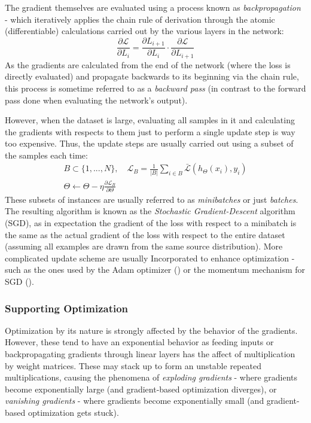 \documentclass{article}
\begin{document}
\medskip
\noindent
The gradient themselves are evaluated using a process known as \emph{backpropagation} - which iteratively applies the chain rule of derivation through the atomic (differentiable) calculations carried out by the various layers in the network:
\begin{equation*}
    \frac{\partial \mathcal{L}}{\partial L_i} = \frac{\partial L_{i+1}}{\partial L_i} \cdot \frac{\partial \mathcal{L}}{\partial L_{i+1}}
\end{equation*}
As the gradients are calculated from the end of the network (where the loss is directly evaluated) and propagate backwards to its beginning via the chain rule, this process is sometime referred to as a \emph{backward pass} (in contrast to the forward pass done when evaluating the network's output).

\medskip
\noindent
However, when the dataset is large, evaluating all samples in it and calculating the gradients with respects to them just to perform a single update step is way too expensive. Thus, the update steps are usually carried out using a subset of the samples each time:
\begin{equation*}
    \begin{gathered}
        B \subset \{1,...,N\}, \quad \mathcal{L}_B = \frac{1}{|B|}\sum_{i\in B}{\bar{\mathcal{L}}(h_\Theta(x_i), y_i)} \\
        \Theta \gets \Theta - \eta \frac{\partial \mathcal{L}_B}{\partial \Theta}
    \end{gathered}
\end{equation*}
These subsets of instances are usually referred to as \emph{minibatches} or just \emph{batches}. The resulting algorithm is known as the \emph{Stochastic Gradient-Descent} algorithm (SGD), as in expectation the gradient of the loss with respect to a minibatch is the same as the actual gradient of the loss with respect to the entire dataset (assuming all examples are drawn from the same source distribution). More complicated update scheme are usually Incorporated to enhance optimization - such as the ones used by the Adam optimizer (\citet{kingma2014adam}) or the momentum mechanism for SGD (\citet{qian1999momentum}).

\subsubsection{Supporting Optimization}
\label{subsec:support-optim}

Optimization by its nature is strongly affected by the behavior of the gradients. However, these tend to have an exponential behavior as feeding inputs or backpropagating gradients through linear layers has the affect of multiplication by weight matrices. These may stack up to form an unstable repeated multiplications, causing the phenomena of \emph{exploding gradients} - where gradients become exponentially large (and gradient-based optimization diverges), or \emph{vanishing gradients} - where gradients become exponentially small (and gradient-based optimization gets stuck).
\end{document}
